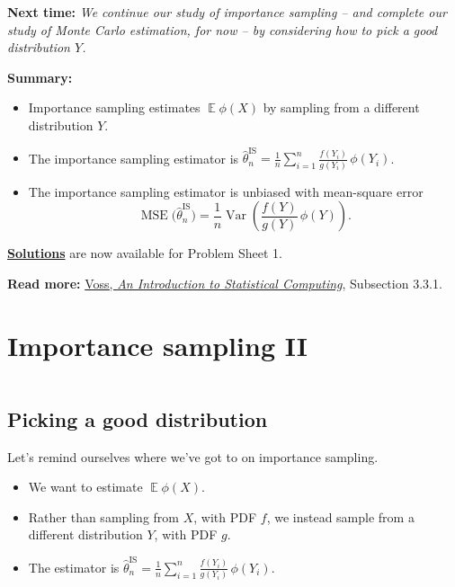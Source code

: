 \documentclass[
  letterpaper,
  DIV=11,
  numbers=noendperiod]{scrreprt}
\newcommand{\Exg}{\operatorname{\mathbb{E}}}
\theoremstyle{plain}
\theoremstyle{definition}
\theoremstyle{definition}
\theoremstyle{remark}
\begin{document}
\textbf{Next time:} \emph{We continue our study of importance sampling
-- and complete our study of Monte Carlo estimation, for now -- by
considering how to pick a good distribution \(Y\).}

\textbf{Summary:}

\begin{itemize}
\item
  Importance sampling estimates \(\Exg \phi(X)\) by sampling from a
  different distribution \(Y\).
\item
  The importance sampling estimator is
  \({\displaystyle \widehat{\theta}_n^{\mathrm{IS}} = \frac{1}{n} \sum_{i=1}^n \frac{f(Y_i)}{g(Y_i)}\,\phi(Y_i)}\).
\item
  The importance sampling estimator is unbiased with mean-square error
  \[ \operatorname{MSE}\big(\widehat{\theta}_n^{\mathrm{IS}}\big) = \frac{1}{n} \operatorname{Var}\left( \frac{f(Y)}{g(Y)}\,\phi(Y) \right) . \]
\end{itemize}

\textbf{\hyperref[solutions]{Solutions}} are now available for Problem
Sheet 1.

\textbf{Read more:}
\href{https://leeds.primo.exlibrisgroup.com/permalink/44LEE_INST/1fj430b/cdi_askewsholts_vlebooks_9781118728031}{Voss,
\emph{An Introduction to Statistical Computing}}, Subsection 3.3.1.

\chapter{Importance sampling II}\label{importance-sampling-ii}

\[ \]

\section{Picking a good distribution}\label{picking-a-good-distribution}

Let's remind ourselves where we've got to on importance sampling.

\begin{itemize}
\item
  We want to estimate \(\Exg \phi(X)\).
\item
  Rather than sampling from \(X\), with PDF \(f\), we instead sample
  from a different distribution \(Y\), with PDF \(g\).
\item
  The estimator is
  \({\displaystyle \widehat\theta_n^{\text{IS}} = \frac{1}{n} \sum_{i=1}^n \frac{f(Y_i)}{g(Y_i)} \, \phi(Y_i) .}\)
\end{itemize}
\end{document}

